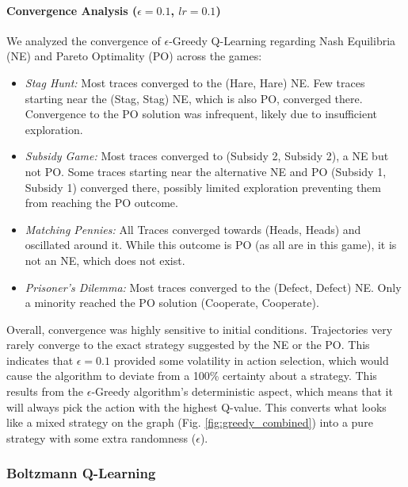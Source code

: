 \documentclass[12pt,a4paper, onecolumn]{exam}
\begin{document}
\paragraph{Convergence Analysis ($\epsilon=0.1$, $lr=0.1$)}
We analyzed the convergence of $\epsilon$-Greedy Q-Learning regarding Nash Equilibria (NE) and Pareto Optimality (PO) across the games:

\begin{itemize}
    \item \textit{Stag Hunt:} Most traces converged to the (Hare, Hare) NE.
          Few traces starting near the (Stag, Stag) NE, which is also PO, converged there.
          Convergence to the PO solution was infrequent, likely due to insufficient exploration.
    \item \textit{Subsidy Game:} Most traces converged to (Subsidy 2, Subsidy 2),
          a NE but not PO. Some traces starting near the alternative NE and PO (Subsidy 1, Subsidy 1)
          converged there, possibly limited exploration preventing them from reaching the PO outcome.
    \item \textit{Matching Pennies:} All Traces converged towards (Heads, Heads) and oscillated around it.
          While this outcome is PO (as all are in this game), it is not an NE, which does not exist.
    \item \textit{Prisoner's Dilemma:} Most traces converged to the (Defect, Defect) NE.
          Only a minority reached the PO solution (Cooperate, Cooperate).
\end{itemize}

Overall, convergence was highly sensitive to initial conditions. Trajectories very rarely converge to the exact strategy suggested by the NE or the PO.
This indicates that $\epsilon=0.1$ provided some volatility in action selection, which would cause the algorithm to deviate from a 100\% certainty about
a strategy. This results from the $\epsilon$-Greedy algorithm's deterministic aspect, which means that it will always pick the action with the highest Q-value.
This converts what looks like a mixed strategy on the graph (Fig. \ref{fig:greedy_combined}) into a pure strategy with some extra randomness ($\epsilon$).

\subsubsection{Boltzmann Q-Learning} \label{sec:boltzmann}
\end{document}
